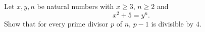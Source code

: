 Let $x,y,n$ be natural numbers with $x \geq 3$, $n\geq 2$ and
$$x^2+5=y^n.$$
Show that for every prime divisor $p$ of $n$, $p-1$ is divisible by $4$.